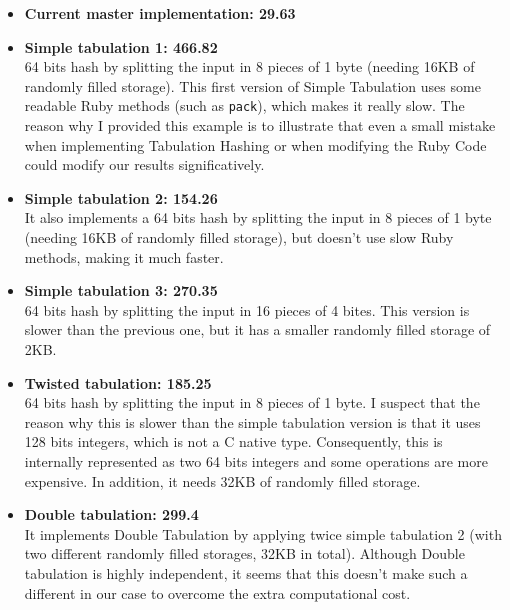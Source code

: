 \documentclass[oneside, 12pt]{article}
\theoremstyle{break}
\begin{document}
\begin{itemize}
\item \textbf{Current master implementation: 29.63}
\item \textbf{Simple tabulation 1: 466.82}\\
64 bits hash by splitting the input in 8 pieces of 1 byte (needing 16KB of randomly filled storage).
This first version of Simple Tabulation uses some readable Ruby methods (such as \lstinline{pack}), which makes it really slow.
The reason why I provided this example is to illustrate that even a small mistake when implementing Tabulation Hashing or when modifying the Ruby Code could modify our results significatively.
\item \textbf{Simple tabulation 2: 154.26}\\
It also implements a 64 bits hash by splitting the input in 8 pieces of 1 byte (needing 16KB of randomly filled storage), but doesn't use slow Ruby methods, making it much faster.
\item \textbf{Simple tabulation 3: 270.35}\\
64 bits hash by splitting the input in 16 pieces of 4 bites.
This version is slower than the previous one, but it has a smaller randomly filled storage of 2KB.
\item \textbf{Twisted tabulation: 185.25}\\
64 bits hash by splitting the input in 8 pieces of 1 byte.
I suspect that the reason why this is slower than the simple tabulation version is that it uses 128 bits integers, which is not a C native type.
Consequently, this is internally represented as two 64 bits integers and some operations are more expensive.
In addition, it needs 32KB of randomly filled storage.
\item \textbf{Double tabulation: 299.4}\\
It implements Double Tabulation by applying twice simple tabulation 2 (with two different randomly filled storages, 32KB in total).
Although Double tabulation is highly independent, it seems that this doesn't make such a different in our case to overcome the extra computational cost.
\end{itemize}
\end{document}
